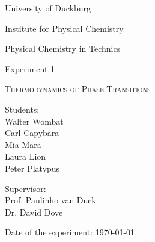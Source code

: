\documentclass{article}
\begin{document}
\begin{titlepage}
	\setlength{\parindent}{0pt}
	\large
\centering
University of Duckburg \par
Institute for Physical Chemistry \par
\vspace{2cm}

{\huge Physical Chemistry in Technics\par}

\vspace{2cm}
Experiment 1

\vspace{1cm}
{\LARGE\scshape  Thermodynamics of Phase Transitions\par}



\vfill

\begin{minipage}[t]{.5\linewidth}
	Students:\\
	Walter Wombat \\
	Carl Capybara \\
	Mia Mara \\
	Laura Lion \\
	Peter Platypus
\end{minipage}%
\begin{minipage}[t]{.5\linewidth}
	\raggedleft
	Supervisor:\\
	Prof. Paulinho van Duck\\
	Dr. David Dove
\end{minipage}

\vspace{2cm}
\raggedright
Date of the experiment: \today
\end{titlepage}
\end{document}
